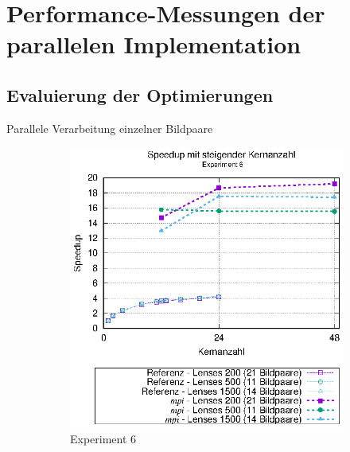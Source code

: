 \section{Performance-Messungen der parallelen Implementation}

\subsection{Evaluierung der Optimierungen}

\begin{frame}{Parallele Verarbeitung einzelner Bildpaare}
	\begin{figure}[h]
		\begin{subfigure}[b]{0.47\textwidth}
			\centering
			\includegraphics[width=\textwidth]{pdf/mpi_speedup_exp6}
			\caption{Experiment 6}
		\end{subfigure}
		\hfill
		\begin{subfigure}[b]{0.47\textwidth}
			\centering

\end{subfigure}
\end{figure}
\end{frame}
